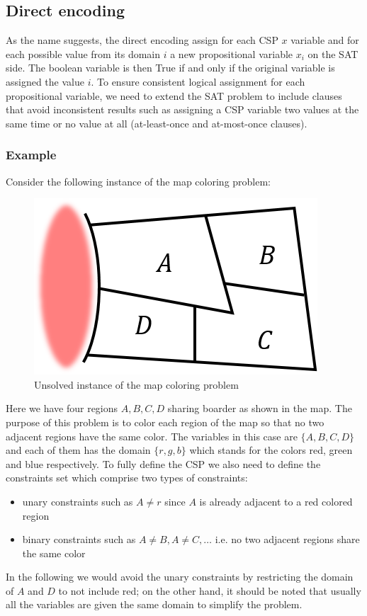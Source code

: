 \subsection{Direct encoding}
As the name suggests, the direct encoding assign for each CSP $x$ variable and for each possible value from its domain $i$ a new propositional variable $x_i$ on the SAT side. The boolean variable is then True if and only if the original variable is assigned the value $i$.  To ensure consistent logical assignment for each propositional variable, we need to extend the SAT problem to include clauses that avoid inconsistent results such as assigning a CSP variable two values at the same time or no value at all (at-least-once and at-most-once clauses).

\subsubsection{Example}
Consider the following instance of the map coloring problem:\\
\begin{figure}[H]
	\centering
	\includegraphics[width=0.5\linewidth]{assets/map_coloring_unsolved}
	\captionsetup{justification=centering,margin=2cm}
	\caption{Unsolved instance of the map coloring problem}
	\label{fig:map_coloring_unsolved}
\end{figure}  
Here we have four regions $A,B,C,D$ sharing boarder as shown in the map. The purpose of this problem is to color each region of the map so that no two adjacent regions have the same color. The variables in this case are $\{A,B,C,D\}$ and each of them has the domain $\{r,g,b\}$ which stands for the colors red, green and blue respectively. To fully define the CSP we also need to define the constraints set which comprise two types of constraints: 
\begin{itemize}
	\item unary constraints such as $A\neq r$ since $A$ is already adjacent to a red colored region 
	\item binary constraints such as $A\neq B, A\neq C,\dots$ i.e. no two adjacent regions share the same color
\end{itemize}
In the following we would avoid the unary constraints by restricting the domain of $A$ and $D$ to not include red; on the other hand, it should be noted that usually all the variables are given the same domain to simplify the problem.

